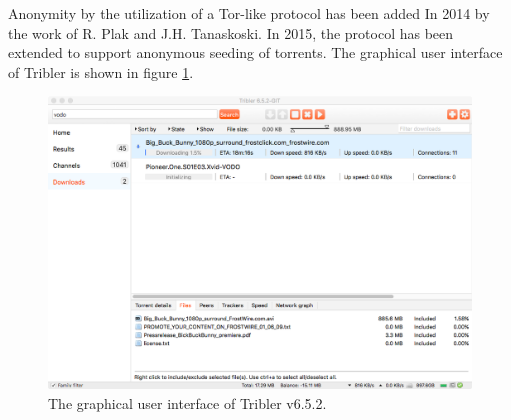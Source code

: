 Anonymity by the utilization of a Tor-like protocol has been added In 2014 by the work of R. Plak\cite{plak2014anonymous} and J.H. Tanaskoski\cite{tanaskoski2014anonymous}. 
In 2015, the protocol has been extended to support anonymous seeding of torrents\cite{ruigrok2015bittorrent}.
The graphical user interface of Tribler is shown in figure \ref{fig:tribler-interface}.

\begin{figure}[!h]
	\centering
	\includegraphics[width=0.9\columnwidth]{images/introduction/tribler_interface}
	\caption{The graphical user interface of Tribler v6.5.2.}
	\label{fig:tribler-interface}
\end{figure}

